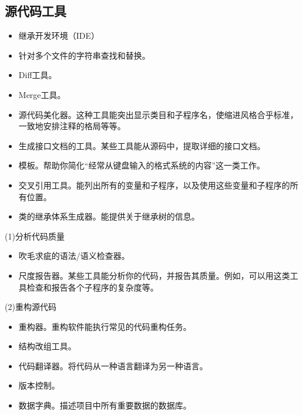\documentclass{article}
\begin{document}
\subsection{源代码工具}
\begin{itemize}
    \item 继承开发环境（IDE）
    \item 针对多个文件的字符串查找和替换。
    \item Diff工具。
    \item Merge工具。
    \item 源代码美化器。这种工具能突出显示类目和子程序名，使缩进风格合乎标准，一致地安排注释的格局等等。
    \item 生成接口文档的工具。某些工具能从源码中，提取详细的接口文档。
    \item 模板。帮助你简化“经常从键盘输入的格式系统的内容”这一类工作。
    \item 交叉引用工具。能列出所有的变量和子程序，以及使用这些变量和子程序的所有位置。
    \item 类的继承体系生成器。能提供关于继承树的信息。
\end{itemize}

\par
(1)分析代码质量
\par
\begin{itemize}
    \item 吹毛求疵的语法/语义检查器。
    \item 尺度报告器。某些工具能分析你的代码，并报告其质量。例如，可以用这类工具检查和报告各个子程序的复杂度等。
\end{itemize}

\par
(2)重构源代码
\par
\begin{itemize}
    \item 重构器。重构软件能执行常见的代码重构任务。
    \item 结构改组工具。
    \item 代码翻译器。将代码从一种语言翻译为另一种语言。
    \item 版本控制。
    \item 数据字典。描述项目中所有重要数据的数据库。
\end{itemize}
\end{document}
